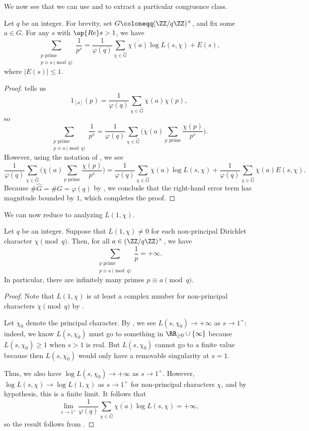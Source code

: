 \documentclass[../notes.tex]{subfiles}
\begin{document}
We now see that we can use  and  to extract a particular congruence class.
\begin{lemma} \label{lem:convert-to-l-1-chi}
	Let $q$ be an integer. For brevity, set $G\coloneqq(\ZZ/q\ZZ)^\times$, and fix some $a\in G$. For any $s$ with $\op{Re}s>1$, we have
	\[\sum_{\substack{p\text{ prime}\\p\equiv a\pmod q}}\frac1{p^s}=\frac1{\varphi(q)}\sum_{\chi\in\widehat G}\overline{\chi(a)}\log L(s,\chi)+E(s),\]
	where $|E(s)|\le1$.
\end{lemma}
\begin{proof}
	 tells us
	\[1_{[a]}(p)=\frac1{\varphi(q)}\sum_{\chi\in\widehat G}\overline\chi(a)\chi(p),\]
	so
	\[\sum_{\substack{p\text{ prime}\\p\equiv a\pmod q}}\frac1{p^s}=\frac1{\varphi(q)}\sum_{\chi\in\widehat G}\Bigg(\overline\chi(a)\sum_{p\text{ prime}}\frac{\chi(p)}{p^s}\Bigg).\]
	However, using the notation of , we see
	\[\frac1{\varphi(q)}\sum_{\chi\in\widehat G}\Bigg(\overline\chi(a)\sum_{p\text{ prime}}\frac{\chi(p)}{p^s}\Bigg)=\frac1{\varphi(q)}\sum_{\chi\in\widehat G}\overline\chi(a)\log L(s,\chi)+\frac1{\varphi(q)}\sum_{\chi\in\widehat G}\overline\chi(a)E(s,\chi).\]
	Because $\#\widehat G=\#G=\varphi(q)$ by , we conclude that the right-hand error term has magnitude bounded by $1$, which completes the proof.
\end{proof}
We can now reduce  to analyzing $L(1,\chi)$.
\begin{proposition} \label{prop:reduce-dir-to-l}
	Let $q$ be an integer. Suppose that $L(1,\chi)\ne0$ for each non-principal Dirichlet character $\chi\pmod q$. Then, for all $a\in(\ZZ/q\ZZ)^\times$, we have
	\[\sum_{\substack{p\text{ prime}\\p\equiv a\pmod q}}\frac1{p}=+\infty.\]
	In particular, there are infinitely many primes $p\equiv a\pmod q$.
\end{proposition}
\begin{proof}
	Note that $L(1,\chi)$ is at least a complex number for non-principal characters $\chi\pmod q$ by .

	Let $\chi_0$ denote the principal character. By , we see $L(s,\chi_0)\to+\infty$ as $s\to1^+$: indeed, we know $L(s,\chi_0)$ must go to something in $\RR_{\ge0}\cup\{\infty\}$ because $L(s,\chi_0)\ge1$ when $s>1$ is real. But $L(s,\chi_0)$ cannot go to a finite value because then $L(s,\chi_0)$ would only have a removable singularity at $s=1$.

	Thus, we also have $\log L(s,\chi_0)\to+\infty$ as $s\to1^+$. However, $\log L(s,\chi)\to\log L(1,\chi)$ as $s\to1^+$ for non-principal characters $\chi$, and by hypothesis, this is a finite limit. It follows that
	\[\lim_{s\to1^+}\frac1{\varphi(q)}\sum_{\chi\in\widehat G}\overline{\chi(a)}\log L(s,\chi)=+\infty,\]
	so the result follows from .
\end{proof}
\end{document}
